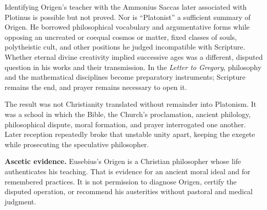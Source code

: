 Identifying Origen's teacher with the Ammonius Saccas later associated with
Plotinus is possible but not proved. Nor is ``Platonist'' a sufficient summary
of Origen. He borrowed philosophical vocabulary and argumentative forms while
opposing an uncreated or coequal cosmos or matter, fixed classes of souls,
polytheistic cult, and other positions he judged incompatible with Scripture.
Whether eternal divine creativity implied successive ages was a different,
disputed question in his works and their transmission. In the
\emph{Letter to Gregory}, philosophy and the mathematical disciplines become
preparatory instruments; Scripture remains the end, and prayer remains
necessary to open it.

The result was not Christianity translated without remainder into Platonism.
It was a school in which the Bible, the Church's proclamation, ancient
philology, philosophical dispute, moral formation, and prayer interrogated one
another. Later reception repeatedly broke that unstable unity apart, keeping
the exegete while prosecuting the speculative philosopher.

\begin{studyframe}
\textbf{Ascetic evidence.} Eusebius's Origen is a Christian philosopher whose
life authenticates his teaching. That is evidence for an ancient moral ideal
and for remembered practices. It is not permission to diagnose Origen, certify
the disputed operation, or recommend his austerities without pastoral and
medical judgment.
\end{studyframe}
